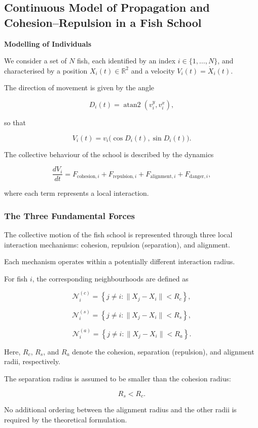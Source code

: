 \documentclass[10pt,a4paper]{article}
\begin{document}
\subsection{Continuous Model of Propagation and
Cohesion--Repulsion in a Fish School}

\noindent\textbf{Modelling of Individuals}

We consider a set of $N$ fish, each identified by an index
$i\in\{1,\ldots,N\}$, and characterised by a position
$X_i(t)\in\mathbb{R}^2$ and a velocity
$V_i(t)=\dot X_i(t)$.

The direction of movement is given by the angle

\[
D_i(t)=\operatorname{atan2}(v_i^y,v_i^x),
\]

so that

\[
V_i(t)=v_i
\bigl(\cos D_i(t),\sin D_i(t)\bigr).
\]

The collective behaviour of the school is described
by the dynamics

\[
\frac{dV_i}{dt}
=
F_{\mathrm{cohesion},i}
+
F_{\mathrm{repulsion},i}
+
F_{\mathrm{alignment},i}
+
F_{\mathrm{danger},i},
\]

where each term represents a local interaction.

\subsubsection*{The Three Fundamental Forces}

The collective motion of the fish school is
represented through three local interaction
mechanisms: cohesion, repulsion (separation),
and alignment.

Each mechanism operates within a potentially
different interaction radius.

For fish $i$, the corresponding neighbourhoods
are defined as

\[
\mathcal N_i^{(c)}
=
\left\{
j\neq i:
\|X_j-X_i\|<R_c
\right\},
\]

\[
\mathcal N_i^{(s)}
=
\left\{
j\neq i:
\|X_j-X_i\|<R_s
\right\},
\]

\[
\mathcal N_i^{(a)}
=
\left\{
j\neq i:
\|X_j-X_i\|<R_a
\right\}.
\]

Here, $R_c$, $R_s$, and $R_a$ denote the
cohesion, separation (repulsion), and
alignment radii, respectively.

The separation radius is assumed to be smaller
than the cohesion radius:

\[
R_s<R_c.
\]

No additional ordering between the alignment
radius and the other radii is required by
the theoretical formulation.
\end{document}

